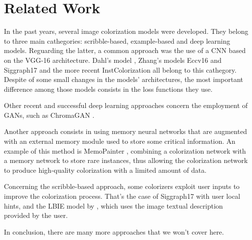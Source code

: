 \section{Related Work}
In the past years, several image colorization models were developed. They belong to three main cathegories: scribble-based, example-based and deep learning models. Reguarding the latter, a common approach was the use of a CNN based on the VGG-16 architecture. Dahl's model \cite{dahl}, Zhang's models Eccv16 \cite{zhang} and Siggraph17 \cite{siggraph} and the more recent InstColorization \cite{su} all belong to this cathegory. Despite of some
small changes in the models' architectures, the most important difference among those models consists in the loss
functions they use.

Other recent and successful deep learning approaches concern the employment of GANs, such as ChromaGAN \cite{chromagan}.
 
Another approach consists in using memory neural networks that are augmented with an external
memory module used to store some critical information. An example of this method is MemoPainter \cite{animation},
combining a colorization network with a memory network to store rare instances, thus allowing the
colorization network to produce high-quality colorization with a limited amount of data.

Concerning the scribble-based approach, some colorizers exploit user inputs to improve the colorization process. That's the case of
Siggraph17 \cite{siggraph} with user local hints, and the LBIE model by \cite{language}, which uses the image textual description provided by the user.

In conclusion, there are many more approaches that we won't cover here.
